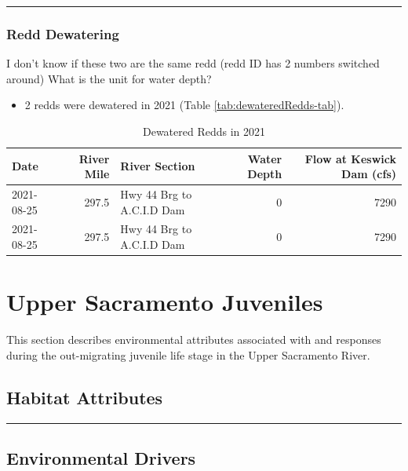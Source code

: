 \documentclass[
]{book}
\providecommand{\tightlist}{%
  \setlength{\itemsep}{0pt}\setlength{\parskip}{0pt}}
\theoremstyle{definition}
\theoremstyle{definition}
\theoremstyle{definition}
\theoremstyle{definition}
\theoremstyle{remark}
\begin{document}
\begin{center}\rule{0.5\linewidth}{0.5pt}\end{center}

\hypertarget{redd-dewatering}{%
\subsection{Redd Dewatering}\label{redd-dewatering}}

I don't know if these two are the same redd (redd ID has 2 numbers switched around)
What is the unit for water depth?

\begin{itemize}
\tightlist
\item
  2 redds were dewatered in 2021 (Table \ref{tab:dewateredRedds-tab}).
\end{itemize}

\begin{table}
\centering
\caption{Dewatered Redds in 2021}
\centering
\begin{tabular}[t]{lrlrr}
\hline
Date & River Mile & River Section & Water Depth & Flow at Keswick Dam (cfs)\\
\hline
2021-08-25 & 297.5 & Hwy 44 Brg to A.C.I.D Dam & 0 & 7290\\
\hline
2021-08-25 & 297.5 & Hwy 44 Brg to A.C.I.D Dam & 0 & 7290\\
\hline
\end{tabular}
\end{table}

\hypertarget{upper-sacramento-juveniles}{%
\chapter{Upper Sacramento Juveniles}\label{upper-sacramento-juveniles}}

This section describes environmental attributes associated with and responses during the out-migrating juvenile life stage in the Upper Sacramento River.

\hypertarget{habitat-attributes-1}{%
\section{Habitat Attributes}\label{habitat-attributes-1}}

\begin{center}\rule{0.5\linewidth}{0.5pt}\end{center}

\hypertarget{environmental-drivers-1}{%
\section{Environmental Drivers}\label{environmental-drivers-1}}
\end{document}
